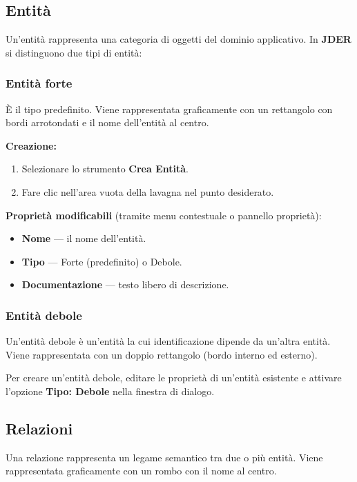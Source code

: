 \documentclass[a4paper,11pt]{article}
\newcommand{\uielement}[1]{\textbf{#1}}
\newcommand{\jder}{\textbf{JDER}}
\begin{document}
\subsection{Entità}

Un'entità rappresenta una categoria di oggetti del dominio applicativo. In \jder{} si distinguono
due tipi di entità:

\subsubsection{Entità forte}

È il tipo predefinito. Viene rappresentata graficamente con un rettangolo con bordi arrotondati
e il nome dell'entità al centro.

\textbf{Creazione:}
\begin{enumerate}
  \item Selezionare lo strumento \uielement{Crea Entità}.
  \item Fare clic nell'area vuota della lavagna nel punto desiderato.
\end{enumerate}

\textbf{Proprietà modificabili} (tramite menu contestuale o pannello proprietà):
\begin{itemize}
  \item \textbf{Nome} --- il nome dell'entità.
  \item \textbf{Tipo} --- Forte (predefinito) o Debole.
  \item \textbf{Documentazione} --- testo libero di descrizione.
\end{itemize}

\subsubsection{Entità debole}

Un'entità debole è un'entità la cui identificazione dipende da un'altra entità. Viene
rappresentata con un doppio rettangolo (bordo interno ed esterno).

Per creare un'entità debole, editare le proprietà di un'entità esistente e attivare l'opzione
\uielement{Tipo: Debole} nella finestra di dialogo.

\subsection{Relazioni}

Una relazione rappresenta un legame semantico tra due o più entità. Viene rappresentata
graficamente con un rombo con il nome al centro.
\end{document}
